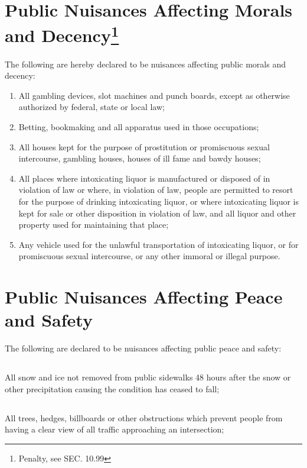 \section{Public Nuisances Affecting Morals and Decency\footnote{Penalty, see SEC. 10.99}}
    The following are hereby declared to be nuisances affecting public morals and decency:
\begin{enumerate}[{\indent}A)]
    \item All gambling devices, slot machines and punch boards, except as otherwise authorized by federal, state or local law;
    \item Betting, bookmaking and all apparatus used in those occupations;
    \item All houses kept for the purpose of prostitution or promiscuous sexual intercourse, gambling houses, houses of ill fame and bawdy houses;
    \item All places where intoxicating liquor is manufactured or disposed of in violation of law or where, in violation of law, people are permitted to resort for the purpose of drinking intoxicating liquor, or where intoxicating liquor is kept for sale or other disposition in violation of law, and all liquor and other property used for maintaining that place;
    \item Any vehicle used for the unlawful transportation of intoxicating liquor, or for promiscuous sexual intercourse, or any other immoral or illegal purpose.
\end{enumerate}

\section{Public Nuisances Affecting Peace and Safety}
The following are declared to be nuisances affecting public peace and safety:
\subsection{}
All snow and ice not removed from public sidewalks 48 hours after the snow or other precipitation causing the condition has ceased to fall;
\subsection{}
All trees, hedges, billboards or other obstructions which prevent people from having a clear view of all traffic approaching an intersection;
